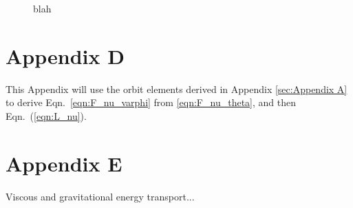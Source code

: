 \documentclass[preprint]{aastex62}
\begin{document}
\begin{figure}
    \caption{
        \label{fig:de_prime_nogravity}
        blah
    }
\end{figure}

\section{Appendix D}
\label{sec:Appendix D}

This Appendix will use the orbit elements derived in Appendix \ref{sec:Appendix A} to
derive Eqn.\ \ref{eqn:F_nu_varphi} from \ref{eqn:F_nu_theta}, and then Eqn.\ (\ref{eqn:L_nu}).

\section{Appendix E}
\label{sec:Appendix E}

Viscous and gravitational energy transport...



\end{document}
